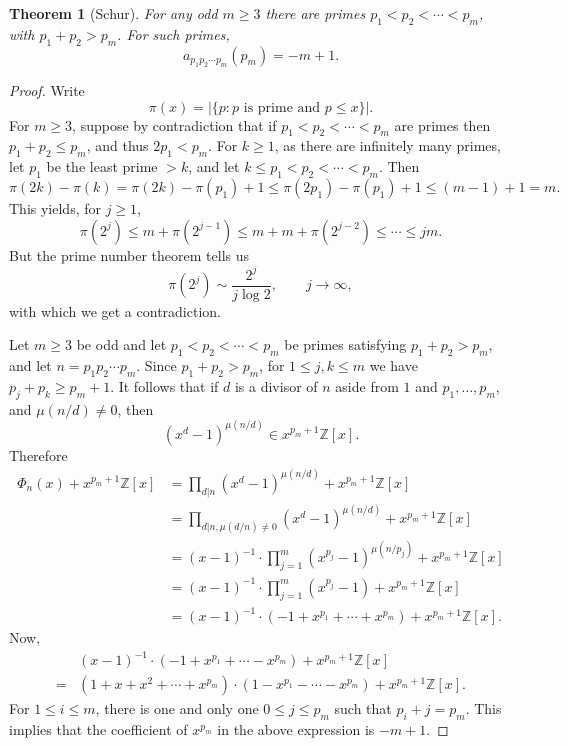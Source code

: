 \documentclass{amsart}
\newtheorem{theorem}{Theorem}
\theoremstyle{definition}
\begin{document}
\begin{theorem}[Schur]
For any odd $m \geq 3$ there are primes $p_1<p_2<\cdots<p_m$, with $p_1+p_2>p_m$.
For such primes,
\[
a_{p_1p_2\cdots p_m}(p_m) = -m+1.
\]
\end{theorem}
\begin{proof}
Write
\[
\pi(x) = |\{p: \textrm{$p$ is prime and $p \leq x$}\}|.
\]
For  $m \geq 3$, suppose by contradiction that if
$p_1<p_2<\cdots<p_m$ are primes then $p_1+p_2 \leq p_m$, and thus
$2p_1<p_m$.
For $k \geq 1$, 
as there are infinitely many primes, let $p_1$ be the least prime $> k$, and let
$k \leq p_1<p_2<\cdots<p_m$. 
Then
\[
\pi(2k)-\pi(k) = \pi(2k) - \pi(p_1) +1 \leq \pi(2p_1) - \pi(p_1) + 1
\leq (m-1)+1 = m.
\]
This yields, for $j \geq 1$,
\[
\pi(2^j) \leq m+\pi(2^{j-1}) \leq m+m+\pi(2^{j-2}) \leq 
\cdots \leq jm.
\]
But the prime number theorem tells us 
\[
\pi(2^j) \sim \frac{2^j}{j \log 2},\qquad j \to \infty,
\]
with which we get a contradiction. 

Let $m \geq 3$ be odd and let $p_1<p_2<\cdots<p_m$ be primes satisfying $p_1+p_2>p_m$,
and let $n=p_1  p_2 \cdots p_m$. Since $p_1+p_2>p_m$, for $1 \leq j,k \leq m$ we have $p_j+p_k \geq p_m+1$. 
It follows that if $d$ is a divisor of $n$ aside from $1$ and $p_1,\ldots,p_m$, and $\mu(n/d) \neq 0$, then
\[
(x^d-1)^{\mu(n/d)} \in x^{p_m+1} \mathbb{Z}[x].
\]
Therefore
\begin{align*}
\Phi_n(x)+x^{p_m+1} \mathbb{Z}[x]&=\prod_{d|n} (x^d-1)^{\mu(n/d)}+x^{p_m+1} \mathbb{Z}[x]\\
&=\prod_{d|n, \mu(d/n) \neq 0} (x^d-1)^{\mu(n/d)}+x^{p_m+1} \mathbb{Z}[x]\\
&=(x-1)^{-1} \cdot \prod_{j=1}^m (x^{p_j}-1)^{\mu(n/p_j)}+x^{p_m+1} \mathbb{Z}[x]\\
&=(x-1)^{-1} \cdot  \prod_{j=1}^m (x^{p_j}-1) +x^{p_m+1} \mathbb{Z}[x]\\
&=(x-1)^{-1} \cdot (-1+x^{p_1}+\cdots+x^{p_m}) +x^{p_m+1} \mathbb{Z}[x].
\end{align*}
Now,
\[
\begin{split}
&(x-1)^{-1} \cdot (-1+x^{p_1}+\cdots-x^{p_m}) +x^{p_m+1} \mathbb{Z}[x]\\
=&(1+x+x^2+\cdots+x^{p_m}) \cdot (1-x^{p_1}-\cdots-x^{p_m}) +x^{p_m+1} \mathbb{Z}[x].
\end{split}
\]
For $1 \leq i \leq m$, 
there is one and only one
$0 \leq j \leq p_m$ such that 
$p_i+j=p_m$. This implies that the coefficient of $x^{p_m}$ in the above expression is
$-m+1$. 
\end{proof}
\end{document}
